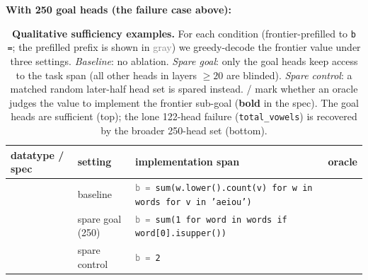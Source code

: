\begin{table}[p]
\vspace{1em}
{\centering\footnotesize\textbf{With 250 goal heads (the failure case above):}\par}
\vspace{0.3em}
\begin{tabular}{l l p{7cm} c}
\toprule
datatype / spec & setting & implementation span & oracle \\
\midrule
{} & baseline & \texttt{\textcolor{gray}{b =} sum(w.lower().count(v) for w in words for v in 'aeiou')} & \textcolor{ForestGreen}{} \\
 & spare goal (250) & \texttt{\textcolor{gray}{b =} sum(1 for word in words if word[0].isupper())} & \textcolor{BrickRed}{} \\
 & spare control & \texttt{\textcolor{gray}{b =} 2} & \textcolor{BrickRed}{} \\
\bottomrule
\end{tabular}
\caption{\textbf{Qualitative sufficiency examples.} For each condition (frontier-prefilled to \texttt{b =}; the prefilled prefix is shown in \textcolor{gray}{gray}) we greedy-decode the frontier value under three settings. \emph{Baseline}: no ablation. \emph{Spare goal}: only the goal heads keep access to the task span (all other heads in layers $\geq 20$ are blinded). \emph{Spare control}: a matched random later-half head set is spared instead. / mark whether an oracle judges the value to implement the frontier sub-goal (\textbf{bold} in the spec). The goal heads are sufficient (top); the lone 122-head failure (\texttt{total\_vowels}) is recovered by the broader 250-head set (bottom).}
\label{tab:sufficiency-qual}
\end{table}
